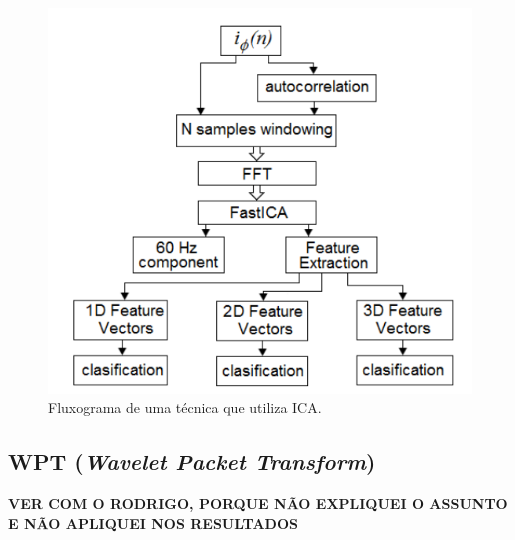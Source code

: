 \begin{figure}[H]
    \caption{Fluxograma de uma técnica que utiliza ICA.}
    \begin{center}
        \includegraphics[scale=.5]{referencial/img/ica_bracamonte_p4.png}
    \end{center}
    \label{fig:ica_bracamonte_p4}
\end{figure}


% 

\subsection{WPT (\textit{Wavelet Packet Transform})}

\textbf{VER COM O RODRIGO, PORQUE NÃO EXPLIQUEI O ASSUNTO E NÃO APLIQUEI NOS RESULTADOS}